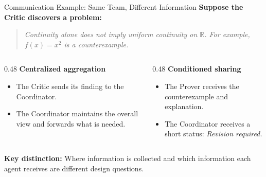 \documentclass[aspectratio=169]{beamer}
\begin{document}
\begin{frame}{Communication Example: Same Team, Different Information}
\small
\textbf{Suppose the Critic discovers a problem:}

\begin{quote}
\emph{Continuity alone does not imply uniform continuity on $\mathbb{R}$.
For example, $f(x)=x^2$ is a counterexample.}
\end{quote}

\vspace{0.05cm}
\begin{columns}[T]
    \begin{column}{0.48\textwidth}
        \textbf{Centralized aggregation}
        \begin{itemize}
            \item The Critic sends its finding to the Coordinator.
            \item The Coordinator maintains the overall view and forwards what is needed.
        \end{itemize}
    \end{column}
    \begin{column}{0.48\textwidth}
        \textbf{Conditioned sharing}
        \begin{itemize}
            \item The Prover receives the counterexample and explanation.
            \item The Coordinator receives a short status: \emph{Revision required.}
        \end{itemize}
    \end{column}
\end{columns}

\vspace{0.2cm}
\textbf{Key distinction:} Where information is collected and which information each agent receives are different design questions.

\end{frame}
\end{document}
